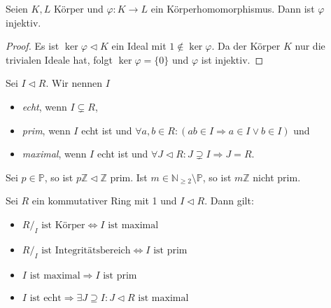 \begin{corollary}\label{corollary:koerperhomom_injektiv}
    Seien $K, L$ Körper und $\varphi:K\to L$ ein Körperhomomorphismus. Dann ist $\varphi$ injektiv.
\end{corollary}

\begin{proof}
    Es ist $\ker\varphi\triangleleft K$ ein Ideal mit $1\not\in\ker\varphi$.
    Da der Körper $K$ nur die trivialen Ideale hat, folgt $\ker\varphi=\{0\}$ und $\varphi$ ist injektiv.
\end{proof}

\begin{definition}
    Sei $I \vartriangleleft R$. Wir nennen $I$
    
    \begin{itemize}
        \item \emph{echt}, wenn $I \subsetneq R$, 
        \item \emph{prim}, wenn $I$ echt ist und
        $ \forall a, b \in R: (ab \in I \Rightarrow a \in I \lor b \in I) $ und
        \item\emph{maximal}, wenn $I$ echt ist und
        $\forall J \vartriangleleft R : J \supsetneq I \Rightarrow J = R. $
    \end{itemize}
\end{definition}

\begin{example}
    Sei $p \in \mathbb{P}$, so ist $p \mathbb{Z} \vartriangleleft \mathbb{Z}$ prim. Ist $m \in \mathbb{N}_{\geq 2} \setminus \mathbb{P}$, so ist $m \mathbb{Z}$ nicht prim.
\end{example}

\begin{proposition}\label{prop:ringideale}
    Sei $R$ ein kommutativer Ring mit 1 und $I \vartriangleleft R$. Dann gilt:
    \begin{itemize}
        \item $R /_{I} \text{ ist Körper} \Leftrightarrow I \text{ ist maximal}$
        \item $R /_{I} \text{ ist Integritätsbereich} \Leftrightarrow I \text{ ist prim}$
        \item $I \text{ ist maximal} \Rightarrow I \text{ ist prim}$
        \item $I \text{ ist echt} \Rightarrow \exists J \supseteq I: J \vartriangleleft R \text{ ist maximal}$
    \end{itemize}
\end{proposition}

